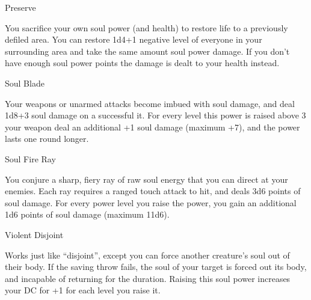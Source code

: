 \begin{soulpower}{Preserve}
  \rangeclose

  You sacrifice your own soul power (and health) to restore life to a
  previously defiled area. You can restore 1d4+1 negative level of everyone in
  your surrounding area and take the same amount soul power damage. If you
  don't have enough soul power points the damage is dealt to your health
  instead.
\end{soulpower}

\begin{soulpower}{Soul Blade}

  Your weapons or unarmed attacks become imbued with soul damage, and deal
  1d8+3 soul damage on a successful it. For every level this power is raised
  above 3 your weapon deal an additional +1 soul damage (maximum +7), and the
  power lasts one round longer.
\end{soulpower}

\begin{soulpower}{Soul Fire Ray}
  \rangeclose
  \instantaneous

  You conjure a sharp, fiery ray of raw soul energy that you can direct at
  your enemies. Each ray requires a ranged touch attack to hit, and deals 3d6
  points of soul damage. For every power level you raise the power, you gain
  an additional 1d6 points of soul damage (maximum 11d6).
\end{soulpower}

\begin{soulpower}{Violent Disjoint}
  \rangetouch

  Works just like ``disjoint'', except you can force another creature's soul
  out of their body. If the saving throw fails, the soul of your target is
  forced out its body, and incapable of returning for the duration. Raising
  this soul power increases your DC for +1 for each level you raise it.
\end{soulpower}

